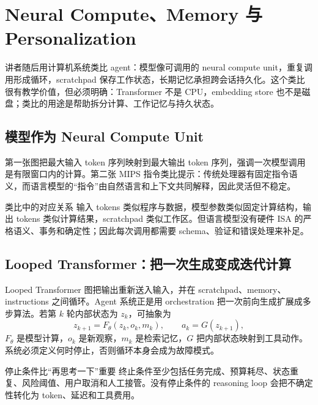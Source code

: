 \section{Neural Compute、Memory 与 Personalization}

讲者随后用计算机系统类比 agent：模型像可调用的 neural compute unit，重复调用形成循环，scratchpad 保存工作状态，长期记忆承担跨会话持久化。这个类比很有教学价值，但必须明确：Transformer 不是 CPU，embedding store 也不是磁盘；类比的用途是帮助拆分计算、工作记忆与持久状态。

\subsection{模型作为 Neural Compute Unit}

第一张图把最大输入 token 序列映射到最大输出 token 序列，强调一次模型调用是有限窗口内的计算。第二张 MIPS 指令类比提示：传统处理器有固定指令语义，而语言模型的“指令”由自然语言和上下文共同解释，因此灵活但不稳定。



\begin{knowledgebox}{类比中的对应关系}
输入 tokens 类似程序与数据，模型参数类似固定计算结构，输出 tokens 类似计算结果，scratchpad 类似工作区。但语言模型没有硬件 ISA 的严格语义、事务和确定性；因此每次调用都需要 schema、验证和错误处理来补足。
\end{knowledgebox}

\subsection{Looped Transformer：把一次生成变成迭代计算}

Looped Transformer 图把输出重新送入输入，并在 scratchpad、memory、instructions 之间循环。Agent 系统正是用 orchestration 把一次前向生成扩展成多步算法。若第 $k$ 轮内部状态为 $z_k$，可抽象为
\[
z_{k+1}=F_\theta(z_k,o_k,m_k),\qquad
a_k=G(z_{k+1}),
\]
$F_\theta$ 是模型计算，$o_k$ 是新观察，$m_k$ 是检索记忆，$G$ 把内部状态映射到工具动作。系统必须定义何时停止，否则循环本身会成为故障模式。


\begin{importantbox}{停止条件比“再思考一下”重要}
终止条件至少包括任务完成、预算耗尽、状态重复、风险阈值、用户取消和人工接管。没有停止条件的 reasoning loop 会把不确定性转化为 token、延迟和工具费用。
\end{importantbox}

